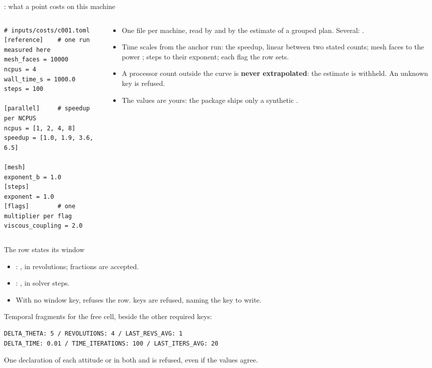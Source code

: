 \begin{frame}[fragile]{: what a point costs on this machine}
\begin{columns}[T]
\begin{column}{0.48\textwidth}
\begin{lstlisting}[style=ftsbase]
# inputs/costs/c001.toml
[reference]    # one run measured here
mesh_faces = 10000
ncpus = 4
wall_time_s = 1000.0
steps = 100

[parallel]     # speedup per NCPUS
ncpus = [1, 2, 4, 8]
speedup = [1.0, 1.9, 3.6, 6.5]

[mesh]
exponent_b = 1.0
[steps]
exponent = 1.0
[flags]        # one multiplier per flag
viscous_coupling = 2.0
\end{lstlisting}
\end{column}
\begin{column}{0.48\textwidth}
\begin{itemize}\small
  \item One file per machine, read by  and by the
        estimate of a grouped plan. Several: .
  \item Time scales from the anchor run: the speedup, linear between two
        stated counts; mesh faces to the power ; steps to their
        exponent; each flag the row sets.
  \item A processor count outside the curve is \textbf{never
        extrapolated}: the estimate is withheld. An unknown key is refused.
  \item The values are yours: the package ships only a synthetic
        .
\end{itemize}
\end{column}
\end{columns}
\end{frame}

\begin{frame}[fragile]{The row states its window}
\begin{itemize}
\item {}: , in revolutions;
fractions are accepted.
\item {}: , in solver steps.
\item With no window key,  refuses the row. 
keys are refused, naming the key to write.
\end{itemize}
\small Temporal fragments for the free cell, beside the other required keys:
\begin{lstlisting}[style=ftsbase]
DELTA_THETA: 5 / REVOLUTIONS: 4 / LAST_REVS_AVG: 1
DELTA_TIME: 0.01 / TIME_ITERATIONS: 100 / LAST_ITERS_AVG: 20
\end{lstlisting}
\begin{alertblock}{One declaration of each attitude}
\small {} or  in both  and
 is refused, even if the values agree.
\end{alertblock}
\end{frame}

